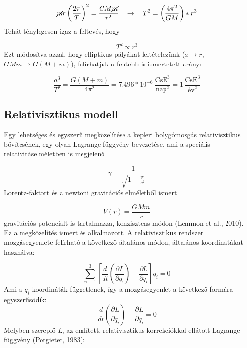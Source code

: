 \begin{multicols}{2}
\begin{equation}
    \cancel{m} r \left( \frac{2 \pi}{T} \right)^{2}
    =
    \frac{GM \cancel{m}}{r^{2}}
    \quad \to \quad
    T^{2}
    =
    \left( \frac{4 \pi^{2}}{GM} \right) * r^{3}
\end{equation}
Tehát ténylegesen igaz a feltevés, hogy

\begin{equation}
    T^{2} \propto r^{3}
\end{equation}
Ezt módosítva azzal, hogy elliptikus pályákat feltételezünk ($a \to r$, $GMm \to G \left( M + m \right)$), felírhatjuk a fentebb is ismertetett arány:

\begin{equation}
    \frac{a^{3}}{T^{2}}
    =
    \frac{G \left( M + m \right)}{4 \pi^{2}}
    =
    7.496 * 10^{-6}\ \frac{\text{CsE}^{3}}{\text{nap}^{2}}
    =
    1\ \frac{\text{CsE}^{3}}{\text{év}^{2}}
\end{equation}


\subsection{Relativisztikus modell} \label{sub:2.2}
Egy lehetséges és egyszerű megközelítése a kepleri bolygómozgás relativisztikus bővítésének, egy olyan Lagrange-függvény bevezetése, ami a speciális relativitáselméletben is megjelenő

\begin{equation}
    \gamma
    =
    \frac{1}{\sqrt{1 - \tfrac{v^{2}}{c^{2}}}}
\end{equation}
Lorentz-faktort és a newtoni gravitációs elméletből ismert

\begin{equation}
    V \left( r \right)
    =
    \frac{GMm}{r}
\end{equation}
gravitációs potenciált is tartalmazza, konzisztens módon (Lemmon et al., 2010\cite{2010arXiv1012.5438L}). Ez a megközelítés ismert és alkalmazott. A relativisztikus rendszer mozgásegyenlete felírható a következő általános módon, általános koordinátákat használva:

\begin{equation}
    \sum_{n=1}^{3} \left[ \frac{d}{dt} \left( \frac{\partial L}{\partial \dot{q}_{i}} \right) - \frac{\partial L}{\partial q_{i}} \right] q_{i}
    =
    0
\end{equation}
Ami a $q_{i}$ koordináták függetlenek, így a mozgásegyenlet a következő formára egyszerűsödik:
\begin{equation}
    \frac{d}{dt} \left( \frac{\partial L}{\partial \dot{q}_{i}} \right) - \frac{\partial L}{\partial q_{i}}
    =
    0
\end{equation}
Melyben szereplő $L$, az említett, relativisztikus korrekciókkal ellátott Lagrange-függvény (Potgieter, 1983\cite{doi:10.1119/1.13441}):


\end{multicols}
